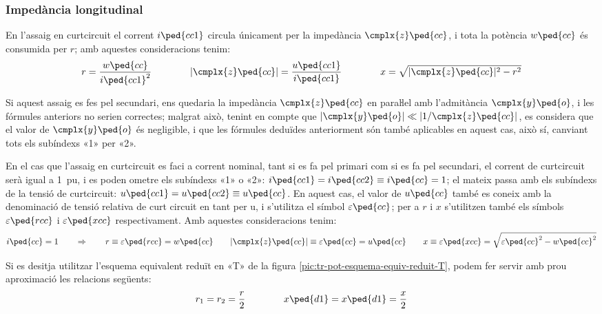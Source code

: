 \subsubsection{Impedància longitudinal}

En l'assaig en curtcircuit el corrent $i\ped{cc1}$ circula
únicament per la impedància $\cmplx{z}\ped{cc}$, i tota la potència
$w\ped{cc}$ és consumida per $r$; amb aquestes consideracions tenim:
\begin{equation}
    r = \frac{w\ped{cc}}{i\ped{cc1}^2} \qquad\qquad
    |\cmplx{z}\ped{cc}| = \frac{u\ped{cc1}}{i\ped{cc1}} \qquad\qquad
    x = \sqrt{|\cmplx{z}\ped{cc}|^2 - r^2}
\end{equation}

Si aquest assaig es fes pel secundari, ens quedaria la impedància
$\cmplx{z}\ped{cc}$ en paraŀlel amb l'admitància
$\cmplx{y}\ped{o}$, i les fórmules anteriors no serien
correctes; malgrat això, tenint en compte que $|\cmplx{y}\ped{o}| \ll
|1/\cmplx{z}\ped{cc}|$, es considera que el valor de
$\cmplx{y}\ped{o}$ és negligible, i que les fórmules deduïdes
anteriorment són també aplicables en aquest cas, això sí, canviant
tots els subíndexs «1» per «2».

En el cas que l'assaig en curtcircuit es faci a corrent nominal,
tant  si es fa pel primari  com si es fa pel secundari, el corrent
de curtcircuit serà igual a \qty{1}{pu}, i es poden ometre els
subíndexs «1» o «2»: $i\ped{cc1} = i\ped{cc2} \equiv i\ped{cc} = 1$;
el mateix passa amb els subíndexs de la tensió de curtcircuit:
$u\ped{cc1} = u\ped{cc2} \equiv u\ped{cc}$. En aquest cas, el valor
de $u\ped{cc}$ també es coneix amb la denominació de
tensió relativa de curt  circuit en tant per u, i s'utilitza  el
símbol $\varepsilon\ped{cc}$; per a $r$ i $x$ s'utilitzen també els
símbols $\varepsilon\ped{rcc}$ i $\varepsilon\ped{xcc}$
respectivament. Amb aquestes consideracions tenim:
\begin{equation}
    i\ped{cc} = 1 \qquad \Rightarrow \qquad r \equiv \varepsilon\ped{rcc} = w\ped{cc} \qquad
    |\cmplx{z}\ped{cc}| \equiv \varepsilon\ped{cc} = u\ped{cc} \qquad
    x \equiv \varepsilon\ped{xcc} = \sqrt{\varepsilon\ped{cc}^2 - w\ped{cc}^2}
    \label{eq:assaig-cc-nomianl}
\end{equation}

Si es desitja utilitzar l'esquema equivalent reduït en «T» de la figura \vref{pic:tr-pot-esquema-equiv-reduit-T}, podem fer servir amb prou aproximació les relacions següents:
\begin{equation}
    r_1 = r_2 = \frac{r}{2} \qquad\qquad x\ped{d1} = x\ped{d1} = \frac{x}{2}
\end{equation}


